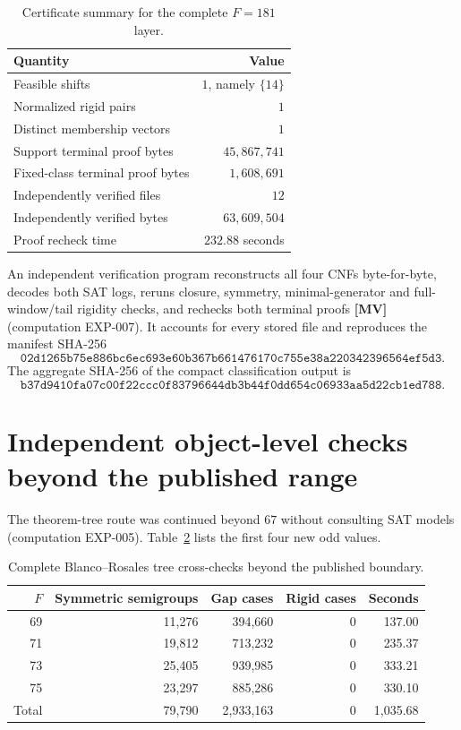 \documentclass[11pt]{article}
\theoremstyle{definition}
\theoremstyle{remark}
\begin{document}
\begin{table}[ht]
\centering
\caption{Certificate summary for the complete $F=181$ layer.}
\label{tab:classification}
\begin{tabular}{lr}
\toprule
Quantity & Value\\
\midrule
Feasible shifts & $1$, namely $\{14\}$\\
Normalized rigid pairs & $1$\\
Distinct membership vectors & $1$\\
Support terminal proof bytes & $45{,}867{,}741$\\
Fixed-class terminal proof bytes & $1{,}608{,}691$\\
Independently verified files & $12$\\
Independently verified bytes & $63{,}609{,}504$\\
Proof recheck time & $232.88$ seconds\\
\bottomrule
\end{tabular}
\end{table}

An independent verification program reconstructs all four CNFs byte-for-byte, decodes both SAT
logs, reruns closure, symmetry, minimal-generator and full-window/tail rigidity checks, and
rechecks both terminal proofs \textbf{[MV]} (computation EXP-007). It accounts for every stored
file and reproduces the manifest SHA-256
\[
\texttt{02d1265b75e886bc6ec693e60b367b661476170c755e38a220342396564ef5d3}.
\]
The aggregate SHA-256 of the compact classification output is
\[
\texttt{b37d9410fa07c00f22ccc0f83796644db3b44f0dd654c06933aa5d22cb1ed788}.
\]

\section{Independent object-level checks beyond the published range}

The theorem-tree route was continued beyond $67$ without consulting SAT models (computation
EXP-005). Table~\ref{tab:tree} lists the first four new odd values.

\begin{table}[ht]
\centering
\caption{Complete Blanco--Rosales tree cross-checks beyond the published boundary.}
\label{tab:tree}
\begin{tabular}{rrrrr}
\toprule
$F$ & Symmetric semigroups & Gap cases & Rigid cases & Seconds\\
\midrule
69 & 11,276 & 394,660 & 0 & 137.00\\
71 & 19,812 & 713,232 & 0 & 235.37\\
73 & 25,405 & 939,985 & 0 & 333.21\\
75 & 23,297 & 885,286 & 0 & 330.10\\
\midrule
Total & 79,790 & 2,933,163 & 0 & 1,035.68\\
\bottomrule
\end{tabular}
\end{table}
\end{document}
